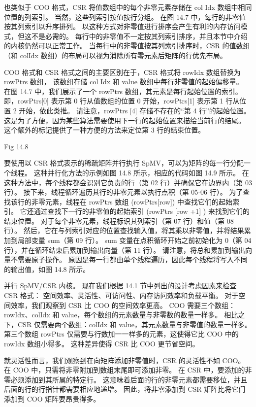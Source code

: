 也类似于 $\mathrm{COO}$ 格式，CSR 将值数组中的每个非零元素存储在 col Idx 数组中相同位置的列索引。 
当然，这些列索引按值按行分组。 在图 14.7 中，每行的非零值按其列索引以升序排列。 
以这种方式对非零值进行排序会产生有利的内存访问模式，但这不是必需的。 
每行中的非零值不一定按其列索引排序，并且本节中介绍的内核仍然可以正常工作。 
当每行中的非零值按其列索引排序时，CSR 的值数组（和 colIdx 数组）的布局可以视为消除所有零元素后矩阵的行优先布局。

COO 格式和 CSR 格式之间的主要区别在于，CSR 格式将 rowIdx 数组替换为 rowPtrs 数组，
该数组存储 col Idx 和 value 数组中每行非零值的起始偏移量。 
在图 14.7 中，我们展示了一个 rowPtrs 数组，其元素是每行起始位置的索引。 
即，rowPtrs[0] 表示第 0 行从值数组的位置 0 开始，rowPtrs[1] 表示第 1 行从位置 2 开始，依此类推。 
请注意，rowPtrs [4] 存储不存在的“第 4 行”的起始位置。 
这是为了方便，因为某些算法需要使用下一行的起始位置来描绘当前行的结尾。 
这个额外的标记提供了一种方便的方法来定位第 3 行的结束位置。

{\color{red} Fig 14.8}

要使用以 CSR 格式表示的稀疏矩阵并行执行 SpMV，可以为矩阵的每一行分配一个线程。 
这种并行化方法的示例如图 14.8 所示，相应的代码如图 14.9 所示。 
在这种方法中，每个线程都会识别它负责的行（第 02 行）并确保它在边界内（第 03 行）。 
接下来，线程循环遍历其行的非零元素以执行点积（第 05-06 行）。 
为了查找该行的非零元素，线程在 rowPtrs 数组 (rowPtrs[row]) 中查找它们的起始索引。 
它还通过查找下一行的非零值的起始索引 (rowPtrs [row +1] ) 来找到它们的结束位置。 
对于每个非零元素，线程标识其列索引（第 07 行）和值（第 08 行）。 
然后，它在与列索引对应的位置查找输入值，将其乘以非零值，并将结果累加到局部变量 sum（第 09 行）。 
sum 变量在点积循环开始之前初始化为 0（第 04 行），并在循环结束后累加到输出向量（第 11 行）。 
请注意，将总和累加到输出向量不需要原子操作。 
原因是每一行都由单个线程遍历，因此每个线程将写入不同的输出值，如图 14.8 所示。

并行 SpMV/CSR 内核。 现在我们根据 14.1 节中列出的设计考虑因素来检查 CSR 格式：
空间效率、灵活性、可访问性、内存访问效率和负载平衡。 对于空间效率，我们观察到 CSR 比 COO 的空间效率更高。 
COO 需要三个数组：rowIdx、colIdx 和 value，每个数组的元素数量与非零数的数量一样多。 
相比之下，CSR 仅需要两个数组：colIdx 和 value，其元素数量与非零值的数量一样多。 
第三个数组 rowPtrs 仅需要与行数加一一样多的元素，这使得它比 COO 中的 rowIdx 数组小得多。 
这种差异使得 CSR 比 COO 更节省空间。

就灵活性而言，我们观察到在向矩阵添加非零值时，CSR 的灵活性不如 COO。 
在 $\mathrm{COO}$ 中，只需将非零附加到数组末尾即可添加非零。 在 CSR 中，要添加的非零必须添加到其所属的特定行。 
这意味着后面的行的非零元素都需要移位，并且后面的行的行指针都需要相应地递增。 
因此，将非零添加到 CSR 矩阵比将它们添加到 $\mathrm{COO}$ 矩阵要昂贵得多。

